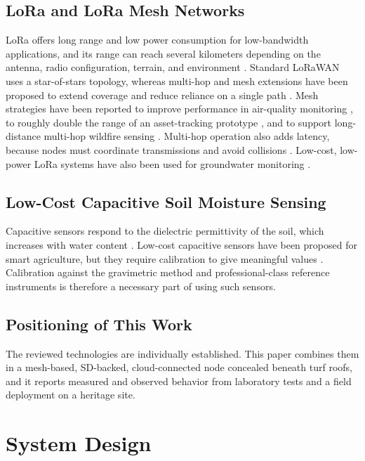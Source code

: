 \documentclass[conference]{IEEEtran}
\begin{document}
\subsection{LoRa and LoRa Mesh Networks}
LoRa offers long range and low power consumption for low-bandwidth applications, and its range can reach several kilometers depending on the antenna, radio configuration, terrain, and environment \cite{centenaro2016longrange}. Standard LoRaWAN uses a star-of-stars topology, whereas multi-hop and mesh extensions have been proposed to extend coverage and reduce reliance on a single path \cite{centelles2021multihop,sole2022mesh,zhu2019mesh}. Mesh strategies have been reported to improve performance in air-quality monitoring \cite{mullick2022mesh}, to roughly double the range of an asset-tracking prototype \cite{andersen2020mesh}, and to support long-distance multi-hop wildfire sensing \cite{khonrang2022multihop}. Multi-hop operation also adds latency, because nodes must coordinate transmissions and avoid collisions \cite{centelles2021multihop}. Low-cost, low-power LoRa systems have also been used for groundwater monitoring \cite{kombo2021groundwater}.

\subsection{Low-Cost Capacitive Soil Moisture Sensing}
Capacitive sensors respond to the dielectric permittivity of the soil, which increases with water content \cite{gonzalezteruel2019sdi12}. Low-cost capacitive sensors have been proposed for smart agriculture, but they require calibration to give meaningful values \cite{kulmany2022capacitive}. Calibration against the gravimetric method and professional-class reference instruments is therefore a necessary part of using such sensors.

\subsection{Positioning of This Work}
The reviewed technologies are individually established. This paper combines them in a mesh-based, SD-backed, cloud-connected node concealed beneath turf roofs, and it reports measured and observed behavior from laboratory tests and a field deployment on a heritage site.

\section{System Design}\label{sec:design}
\end{document}
